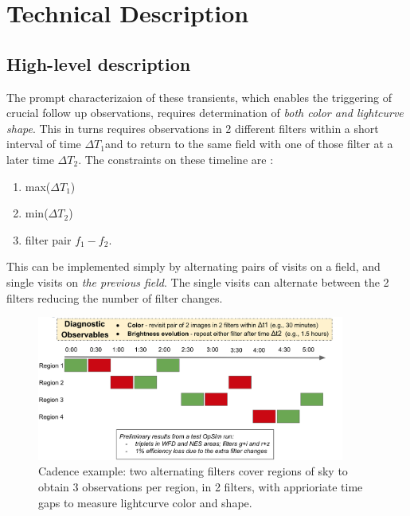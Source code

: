 \documentclass[12pt, letterpaper]{article}
\newcommand{\dtone}{\ensuremath{\Delta T_1}}
\newcommand{\dttwo}{\ensuremath{\Delta T_2}}
\begin{document}
\clearpage
\section{Technical Description}

\subsection{High-level description}

The prompt characterizaion of these transients, which enables the triggering of crucial follow up observations, requires determination of \emph{both color and lightcurve shape}. This in turns requires observations in 2 different filters within a short interval of time \dtone  and to return to the same field with one of those filter at a later time \dttwo.  The constraints on these timeline are :
\begin{enumerate}
    \item max(\dtone )
    \item min(\dttwo )
    \item filter pair $f_1-f_2$.
\end{enumerate}
This can be implemented simply by alternating pairs of visits on a field, and single visits on \emph{the previous field}. The single visits can alternate between the 2 filters reducing the number of filter changes.

\begin{figure}[!h]
\includegraphics[width=0.9\textwidth]{figures/highLevelCadence.png}
\caption{Cadence example: two alternating filters cover regions of sky to obtain 3 observations per region, in 2 filters, with apprioriate time gaps to measure lightcurve color and shape.}
\end{figure}
\end{document}
